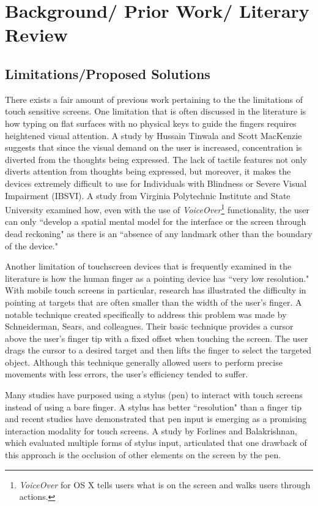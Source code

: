 \documentclass{article}
\begin{document}
\section{Background/ Prior Work/ Literary Review}
\subsection{Limitations/Proposed Solutions}
There exists a fair amount of previous work pertaining to the the limitations of touch sensitive screens. One limitation that is often discussed in the literature is how typing on flat surfaces with no physical keys to guide the fingers requires heightened visual attention. A study by Hussain Tinwala and Scott MacKenzie suggests that since the visual demand on the user is increased, concentration is diverted from the thoughts being expressed. \cite{Tinwala:2010:ETE:1868914.1868972} The lack of tactile features not only diverts attention from thoughts being expressed, but moreover, it makes the devices extremely difficult to use for Individuals with Blindness or Severe Visual Impairment (IBSVI). A study from Virginia Polytechnic Institute and State University examined how, even with the use of \textit{VoiceOver}\footnote{\textit{VoiceOver} for OS X tells users what is on the screen and walks users through actions.\cite{VoiceOver}} functionality, the user can only ``develop a spatial mental model for the interface or the screen through dead reckoning" as there is an ``absence of any landmark other than the boundary of the device." \cite{El-Glaly:2013:TTF:2460625.2460665} 


Another limitation of touchscreen devices that is frequently examined in the literature is how the human finger as a pointing device has ``very low resolution."\cite{Albinsson} With mobile touch screens in particular, research has illustrated the difficulty in pointing at targets that are often smaller than the width of the user's finger. A notable technique created specifically to address this problem was made by Schneiderman, Sears, and colleagues.\cite{Sears} Their basic technique provides a cursor above the user's finger tip with a fixed offset when touching the screen. The user drags the cursor to a desired target and then lifts the finger to select the targeted object. Although this technique generally allowed users to perform precise movements with less errors, the user's efficiency tended to suffer.\cite{Sears}

Many studies have purposed using a stylus (pen) to interact with touch screens instead of using a bare finger. A stylus has better ``resolution" than a finger tip and recent studies have demonstrated that pen input is emerging as a promising interaction modality for touch screens.\cite{Bi} A study by Forlines and Balakrishnan, which evaluated multiple forms of stylus input, articulated that one drawback of this approach is the occlusion of other elements on the screen by the pen.\cite{Forlines}
\end{document}
